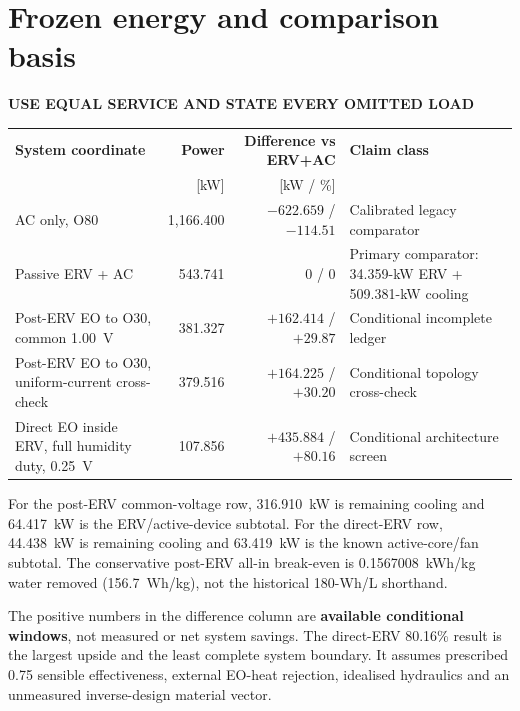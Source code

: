\documentclass[10pt,a4paper]{article}
\newcommand{\eyebrow}[1]{{\sffamily\bfseries\small\color{Teal}\MakeUppercase{#1}}}
\begin{document}
\section{Frozen energy and comparison basis}
\eyebrow{Use equal service and state every omitted load}

\begin{center}\small
\begin{tabularx}{\textwidth}{@{}Y r r Y@{}}
\toprule
\textbf{System coordinate} & \textbf{Power} & \textbf{Difference vs ERV+AC} & \textbf{Claim class} \\
 & [kW] & [kW / \%] & \\
\midrule
AC only, O80 & 1,166.400 & $-622.659$ / $-114.51$ & Calibrated legacy comparator \\
Passive ERV + AC & 543.741 & 0 / 0 & Primary comparator: 34.359-kW ERV + 509.381-kW cooling \\
Post-ERV EO to O30, common 1.00~V & 381.327 & $+162.414$ / $+29.87$ & Conditional incomplete ledger \\
Post-ERV EO to O30, uniform-current cross-check & 379.516 & $+164.225$ / $+30.20$ & Conditional topology cross-check \\
Direct EO inside ERV, full humidity duty, 0.25~V & 107.856 & $+435.884$ / $+80.16$ & Conditional architecture screen \\
\bottomrule
\end{tabularx}
\end{center}

For the post-ERV common-voltage row, 316.910~kW is remaining cooling and
64.417~kW is the ERV/active-device subtotal. For the direct-ERV row,
44.438~kW is remaining cooling and 63.419~kW is the known active-core/fan
subtotal. The conservative post-ERV all-in break-even is
0.1567008~kWh/kg water removed (156.7~Wh/kg), not the historical
180-Wh/L shorthand.

\begin{warningbox}
The positive numbers in the difference column are \textbf{available conditional
windows}, not measured or net system savings. The direct-ERV 80.16\% result is
the largest upside and the least complete system boundary. It assumes
prescribed 0.75 sensible effectiveness, external EO-heat rejection, idealised
hydraulics and an unmeasured inverse-design material vector.
\end{warningbox}
\end{document}
